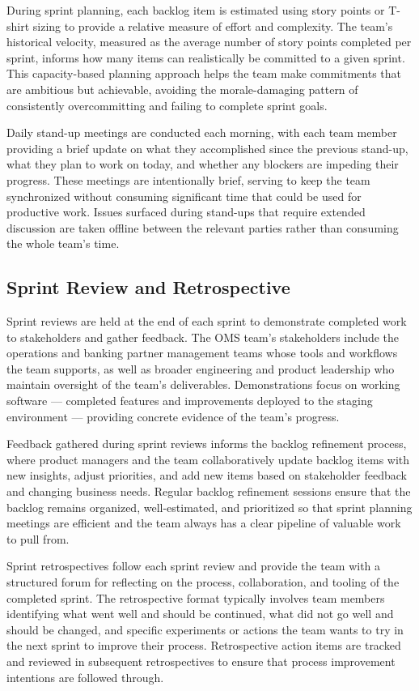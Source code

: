 During sprint planning, each backlog item is estimated using story points or T-shirt sizing to provide a relative measure of effort and complexity. The team's historical velocity, measured as the average number of story points completed per sprint, informs how many items can realistically be committed to a given sprint. This capacity-based planning approach helps the team make commitments that are ambitious but achievable, avoiding the morale-damaging pattern of consistently overcommitting and failing to complete sprint goals.

Daily stand-up meetings are conducted each morning, with each team member providing a brief update on what they accomplished since the previous stand-up, what they plan to work on today, and whether any blockers are impeding their progress. These meetings are intentionally brief, serving to keep the team synchronized without consuming significant time that could be used for productive work. Issues surfaced during stand-ups that require extended discussion are taken offline between the relevant parties rather than consuming the whole team's time.

\subsection{Sprint Review and Retrospective}

Sprint reviews are held at the end of each sprint to demonstrate completed work to stakeholders and gather feedback. The OMS team's stakeholders include the operations and banking partner management teams whose tools and workflows the team supports, as well as broader engineering and product leadership who maintain oversight of the team's deliverables. Demonstrations focus on working software — completed features and improvements deployed to the staging environment — providing concrete evidence of the team's progress.

Feedback gathered during sprint reviews informs the backlog refinement process, where product managers and the team collaboratively update backlog items with new insights, adjust priorities, and add new items based on stakeholder feedback and changing business needs. Regular backlog refinement sessions ensure that the backlog remains organized, well-estimated, and prioritized so that sprint planning meetings are efficient and the team always has a clear pipeline of valuable work to pull from.

Sprint retrospectives follow each sprint review and provide the team with a structured forum for reflecting on the process, collaboration, and tooling of the completed sprint. The retrospective format typically involves team members identifying what went well and should be continued, what did not go well and should be changed, and specific experiments or actions the team wants to try in the next sprint to improve their process. Retrospective action items are tracked and reviewed in subsequent retrospectives to ensure that process improvement intentions are followed through.

